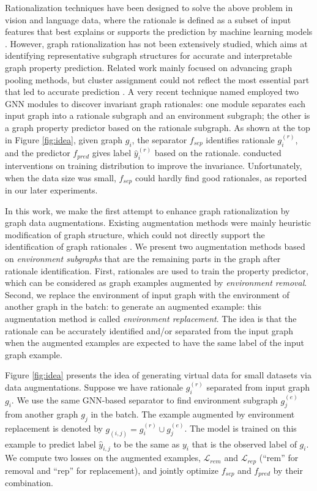 \documentclass[sigconf]{acmart}
\begin{document}
Rationalization techniques have been designed to solve the above problem in vision and language data, where the rationale is defined as a subset of input features that best explains or supports the prediction by machine learning models \cite{chang2020invariant,arjovsky2019invariant,rosenfeld2021risks}.
However, graph rationalization has not been extensively studied, which aims at identifying representative subgraph structures for accurate and interpretable graph property prediction.
Related work mainly focused on advancing graph pooling methods, but cluster assignment could not reflect the most essential part that led to accurate prediction \cite{mesquita2020rethinking,gao2021graph}.
A very recent technique named \dir \cite{wu2022discovering} employed two GNN modules to discover invariant graph rationales: one module separates each input graph into a rationale subgraph and an environment subgraph; the other is a graph property predictor based on the rationale subgraph. As shown at the top in Figure \ref{fig:idea}, given graph $g_i$, the separator $f_{sep}$ identifies rationale $g^{(r)}_i$, and the predictor $f_{pred}$ gives label $\hat{y}^{(r)}_i$ based on the rationale. \dir conducted interventions on training distribution to improve the invariance. Unfortunately, when the data size was small, $f_{sep}$ could hardly find good rationales, as reported in our later experiments.

\vspace{0.05in}
In this work, we make the first attempt to enhance graph rationalization by graph data augmentations. Existing augmentation methods were mainly heuristic modification of graph structure, which could not directly support the identification of graph rationales \cite{rong2019dropedge,wang2020graphcrop,wang2020nodeaug,zhao2021data}. We present two augmentation methods based on \emph{environment subgraphs} that are the remaining parts in the graph after rationale identification. First, rationales are used to train the property predictor, which can be considered as graph examples augmented by \emph{environment removal}.
Second, we replace the environment of input graph with the environment of another graph in the batch:
to generate an augmented example: this augmentation method is called \emph{environment replacement}.
The idea is that the rationale can be accurately identified and/or separated from the input graph when the augmented examples are expected to have the same label of the input graph example.

Figure \ref{fig:idea} presents the idea of generating virtual data for small datasets via data augmentations. Suppose we have rationale $g^{(r)}_i$ separated from input graph $g_i$. We use the same GNN-based separator to find environment subgraph $g^{(e)}_j$ from another graph $g_j$ in the batch.
The example augmented by environment replacement is denoted by $g_{(i,j)}=g^{(r)}_i \cup g^{(e)}_j$. The model is trained on this example to predict label $\hat{y}_{i,j}$ to be the same as $y_i$ that is the observed label of $g_i$.
We compute two losses on the augmented examples, $\mathcal{L}_{rem}$ and $\mathcal{L}_{rep}$ (``rem'' for removal and ``rep'' for replacement), and jointly optimize $f_{sep}$ and $f_{pred}$ by their combination.
\end{document}
